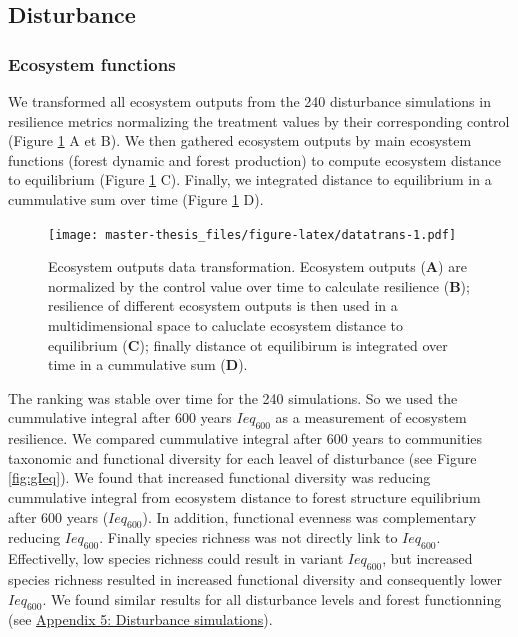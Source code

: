 \documentclass[12pt,]{article}
\theoremstyle{definition}
\theoremstyle{definition}
\theoremstyle{remark}
\begin{document}
\subsection{Disturbance}\label{disturbance-1}

\subsubsection{Ecosystem functions}\label{ecosystem-functions-1}

We transformed all ecosystem outputs from the 240 disturbance
simulations in resilience metrics normalizing the treatment values by
their corresponding control (Figure \ref{fig:datatrans} A et B). We then
gathered ecosystem outputs by main ecosystem functions (forest dynamic
and forest production) to compute ecosystem distance to equilibrium
(Figure \ref{fig:datatrans} C). Finally, we integrated distance to
equilibrium in a cummulative sum over time (Figure \ref{fig:datatrans}
D).

\begin{figure}[htbp]
\centering
\texttt{[image: master-thesis\_files/figure-latex/datatrans-1.pdf]}
\caption{\label{fig:datatrans}Ecosystem outputs data transformation.
Ecosystem outputs (\textbf{A}) are normalized by the control value over
time to calculate resilience (\textbf{B}); resilience of different
ecosystem outputs is then used in a multidimensional space to caluclate
ecosystem distance to equilibrium (\textbf{C}); finally distance ot
equilibirum is integrated over time in a cummulative sum (\textbf{D}).}
\end{figure}

The ranking was stable over time for the 240 simulations. So we used the
cummulative integral after 600 years \(Ieq_{600}\) as a measurement of
ecosystem resilience. We compared cummulative integral after 600 years
to communities taxonomic and functional diversity for each leavel of
disturbance (see Figure \ref{fig:gIeq}). We found that increased
functional diversity \citep[FDiv,][]{villeger_new_2008} was reducing
cummulative integral from ecosystem distance to forest structure
equilibrium after 600 years (\(Ieq_{600}\)). In addition, functional
evenness was complementary reducing \(Ieq_{600}\). Finally species
richness was not directly link to \(Ieq_{600}\). Effectivelly, low
species richness could result in variant \(Ieq_{600}\), but increased
species richness resulted in increased functional diversity and
consequently lower \(Ieq_{600}\). We found similar results for all
disturbance levels and forest functionning (see
\protect\hyperlink{appendix-5-disturbance-simulations}{Appendix 5:
Disturbance simulations}).
\end{document}
